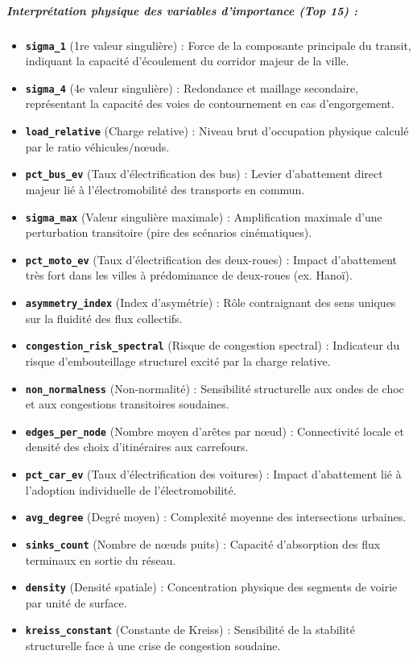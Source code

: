 \documentclass[10pt, a4paper]{article}
\begin{document}
\subparagraph{Interprétation physique des variables d'importance (Top
15)
:}\label{interpruxe9tation-physique-des-variables-dimportance-top-15}

\begin{itemize}
\item
  \textbf{\texttt{sigma\_1}} (1re valeur singulière) : Force de la
  composante principale du transit, indiquant la capacité d'écoulement
  du corridor majeur de la ville.
\item
  \textbf{\texttt{sigma\_4}} (4e valeur singulière) : Redondance et
  maillage secondaire, représentant la capacité des voies de
  contournement en cas d'engorgement.
\item
  \textbf{\texttt{load\_relative}} (Charge relative) : Niveau brut
  d'occupation physique calculé par le ratio véhicules/nœuds.
\item
  \textbf{\texttt{pct\_bus\_ev}} (Taux d'électrification des bus) :
  Levier d'abattement direct majeur lié à l'électromobilité des
  transports en commun.
\item
  \textbf{\texttt{sigma\_max}} (Valeur singulière maximale) :
  Amplification maximale d'une perturbation transitoire (pire des
  scénarios cinématiques).
\item
  \textbf{\texttt{pct\_moto\_ev}} (Taux d'électrification des
  deux-roues) : Impact d'abattement très fort dans les villes à
  prédominance de deux-roues (ex. Hanoï).
\item
  \textbf{\texttt{asymmetry\_index}} (Index d'asymétrie) : Rôle
  contraignant des sens uniques sur la fluidité des flux collectifs.
\item
  \textbf{\texttt{congestion\_risk\_spectral}} (Risque de congestion
  spectral) : Indicateur du risque d'embouteillage structurel excité par
  la charge relative.
\item
  \textbf{\texttt{non\_normalness}} (Non-normalité) : Sensibilité
  structurelle aux ondes de choc et aux congestions transitoires
  soudaines.
\item
  \textbf{\texttt{edges\_per\_node}} (Nombre moyen d'arêtes par nœud) :
  Connectivité locale et densité des choix d'itinéraires aux carrefours.
\item
  \textbf{\texttt{pct\_car\_ev}} (Taux d'électrification des voitures) :
  Impact d'abattement lié à l'adoption individuelle de
  l'électromobilité.
\item
  \textbf{\texttt{avg\_degree}} (Degré moyen) : Complexité moyenne des
  intersections urbaines.
\item
  \textbf{\texttt{sinks\_count}} (Nombre de nœuds puits) : Capacité
  d'absorption des flux terminaux en sortie du réseau.
\item
  \textbf{\texttt{density}} (Densité spatiale) : Concentration physique
  des segments de voirie par unité de surface.
\item
  \textbf{\texttt{kreiss\_constant}} (Constante de Kreiss) : Sensibilité
  de la stabilité structurelle face à une crise de congestion soudaine.
\end{itemize}
\end{document}
